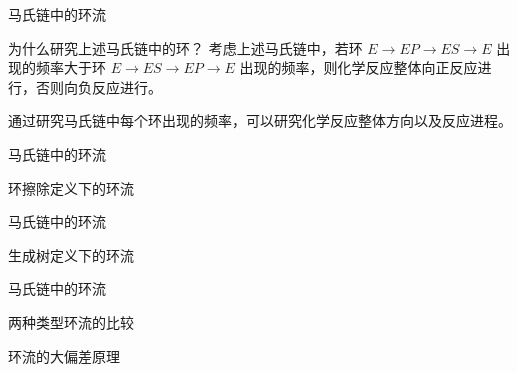 \documentclass{beamer}
\begin{document}
	\begin{frame}{马氏链中的环流}
		\begin{block}{为什么研究上述马氏链中的环？}
			考虑上述马氏链中，若环 $E \rightarrow EP \rightarrow ES \rightarrow E$ 出现的频率大于环 $E \rightarrow ES \rightarrow EP \rightarrow E$ 出现的频率，则化学反应整体向正反应进行，否则向负反应进行。

			通过研究马氏链中每个环出现的频率，可以研究化学反应整体方向以及反应进程。
		\end{block}
	\end{frame}

	\begin{frame}{马氏链中的环流}
		\begin{block}{环擦除定义下的环流}
			
			
		\end{block}
		
	\end{frame}

	\begin{frame}{马氏链中的环流}
		\begin{block}{生成树定义下的环流}

			
		\end{block}
		
	\end{frame}

	\begin{frame}{马氏链中的环流}
		\begin{block}{两种类型环流的比较}

			
		\end{block}
		
	\end{frame}

	\begin{frame}{环流的大偏差原理}
		
	\end{frame}
\end{document}
